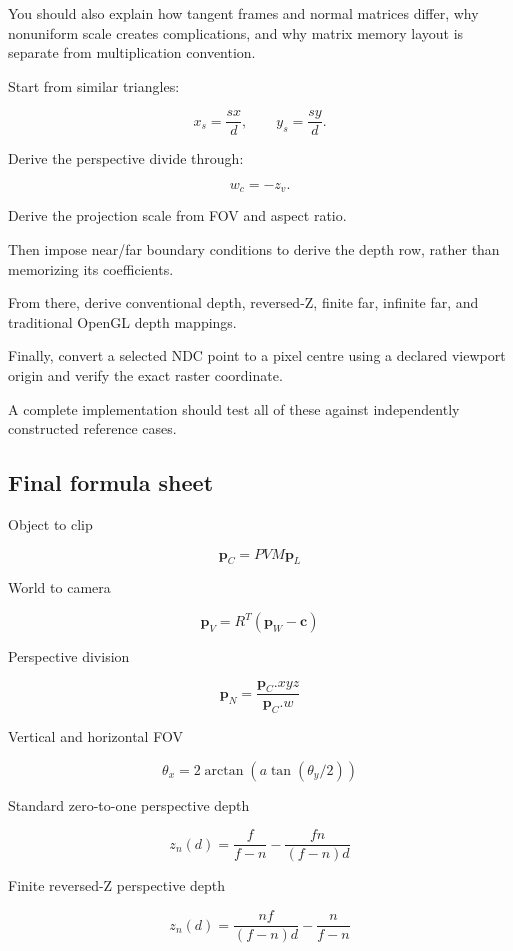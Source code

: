 You should also explain how tangent frames and normal matrices differ, why nonuniform scale creates complications, and why matrix memory layout is separate from multiplication convention.

Start from similar triangles:

\[
 x_s=\frac{sx}{d}, \qquad y_s=\frac{sy}{d}.
\]

Derive the perspective divide through:

\[
 w_c=-z_v.
\]

Derive the projection scale from FOV and aspect ratio.

Then impose near/far boundary conditions to derive the depth row, rather than memorizing its coefficients.

From there, derive conventional depth, reversed-Z, finite far, infinite far, and traditional OpenGL depth mappings.

Finally, convert a selected NDC point to a pixel centre using a declared viewport origin and verify the exact raster coordinate.

A complete implementation should test all of these against independently constructed reference cases.

\subsection{Final formula sheet}\label{02-foundations-ii-ch037-final-formula-sheet}

\hypertarget{02-foundations-ii-ch037-final-formula-sheet}{}

Object to clip

\[
 \boxed{ \mathbf p_C=PVM\mathbf p_L }
\]

World to camera

\[
 \boxed{ \mathbf p_V=R^T(\mathbf p_W-\mathbf c) }
\]

Perspective division

\[
 \boxed{ \mathbf p_N= \frac{\mathbf p_C.xyz}{\mathbf p_C.w} }
\]

Vertical and horizontal FOV

\[
 \boxed{ \theta_x= 2\arctan \left( a\tan(\theta_y/2) \right) }
\]

Standard zero-to-one perspective depth

\[
 \boxed{ z_n(d)= \frac f{f-n} - \frac{fn}{(f-n)d} }
\]

Finite reversed-Z perspective depth

\[
 \boxed{ z_n(d)= \frac{nf}{(f-n)d} - \frac n{f-n} }
\]

